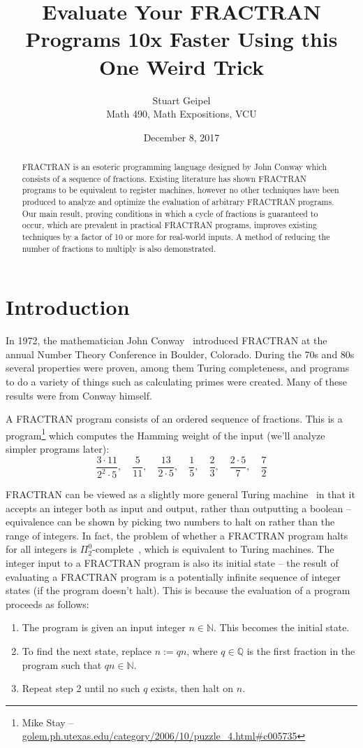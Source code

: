 \documentclass[12pt]{article}
\title{Evaluate Your FRACTRAN Programs 10x Faster Using this One Weird Trick}
\author{Stuart Geipel\\Math 490, Math Expositions, VCU}
\date{December 8, 2017}
\begin{document}
\maketitle

\begin{abstract}
FRACTRAN is an esoteric programming language designed by John Conway which consists of a sequence of fractions. Existing literature has shown FRACTRAN programs to be equivalent to register machines, however no other techniques have been produced to analyze and optimize the evaluation of arbitrary FRACTRAN programs. Our main result, proving conditions in which a cycle of fractions is guaranteed to occur, which are prevalent in practical FRACTRAN programs, improves existing techniques by a factor of 10 or more for real-world inputs. A method of reducing the number of fractions to multiply is also demonstrated.
\end{abstract}

\section{Introduction}

In 1972, the mathematician John Conway~\cite{conway1972} introduced FRACTRAN at the annual Number Theory Conference in Boulder, Colorado. During the 70s and 80s several properties were proven, among them Turing completeness, and programs to do a variety of things such as calculating primes were created. Many of these results were from Conway himself.

A FRACTRAN program consists of an ordered sequence of fractions. This is a program\footnote{Mike Stay -- \url{golem.ph.utexas.edu/category/2006/10/puzzle_4.html\#c005735}} which computes the Hamming weight of the input (we'll analyze simpler programs later):
\[
\frac{3 \cdot 11}{2^2 \cdot 5},\quad
\frac{5}{11},\quad
\frac{13}{2 \cdot 5},\quad
\frac{1}{5},\quad
\frac{2}{3},\quad
\frac{2 \cdot 5}{7},\quad
\frac{7}{2}
\]

FRACTRAN can be viewed as a slightly more general Turing machine~\cite{conway1987} in that it accepts an integer both as input and output, rather than outputting a boolean -- equivalence can be shown by picking two numbers to halt on rather than the range of integers. In fact, the problem of whether a FRACTRAN program halts for all integers is $\Pi^0_2$-complete~\cite{endrullis2009}, which is equivalent to Turing machines. The integer input to a FRACTRAN program is also its initial state -- the result of evaluating a FRACTRAN program is a potentially infinite sequence of integer states (if the program doesn't halt). This is because the evaluation of a program proceeds as follows:
\begin{enumerate}
    \item The program is given an input integer $n \in \mathbb{N}$. This becomes the initial state.
    \item To find the next state, replace $n := qn$, where $q \in \mathbb{Q}$ is the first fraction in the program such that $qn \in \mathbb{N}$.
    \item Repeat step 2 until no such $q$ exists, then halt on $n$.
\end{enumerate}
\end{document}
